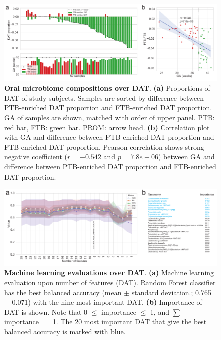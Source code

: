 \documentclass[11pt, a4paper, onecolumn, oneside]{report}
\begin{document}
            \begin{figure}[p]
                \centering
                \includegraphics[width=15 cm]{Figures/PTB/Fig2-Composition.pdf}
                \caption[Oral microbiome compositions over DAT]{\textbf{Oral microbiome compositions over DAT}. \textbf{(a)} Proportions of DAT of study subjects. Samples are sorted by difference between PTB-enriched DAT proportion and FTB-enriched DAT proportion. GA of samples are shown, matched with order of upper panel. PTB: red bar, FTB: green bar. PROM: arrow head. \textbf{(b)} Correlation plot with GA and difference between PTB-enriched DAT proportion and FTB-enriched DAT proportion. Pearson correlation shows strong negative coefficient ($r = -0.542$ and $p = 7.8e-06$) between GA and difference between PTB-enriched DAT proportion and FTB-enriched DAT proportion.}
                \label{fig:PTB-composition}
            \end{figure}
            \clearpage

            \begin{figure}[p]
                \centering
                \includegraphics[width=15 cm]{Figures/PTB/Fig3-ML.pdf}
                \caption[Machine learning evaluations over DAT]{\textbf{Machine learning evaluations over DAT}. \textbf{(a)} Machine learning evaluation upon number of features (DAT). Random Forest classifier has the best balanced accuracy (mean $\pm$ standard deviation.; 0.765 $\pm$ 0.071) with the nine most important DAT. \textbf{(b)} Importance of DAT is shown. Note that 0 $\le$ importance $\le$ 1, and $\sum$ importance $=$ 1. The 20 most important DAT that give the best balanced accuracy is marked with blue.}
                \label{fig:PTB-ML}
            \end{figure}
            \clearpage
\end{document}
